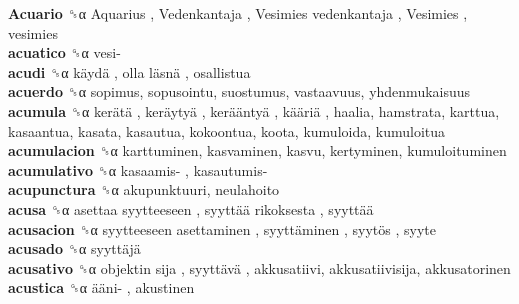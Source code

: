 \textbf{Acuario} ␝α   Aquarius ,  Vedenkantaja ,  Vesimies vedenkantaja ,  Vesimies , vesimies  \\
\textbf{acuatico} ␝α   vesi-   \\
\textbf{acudi} ␝α   käydä ,  olla läsnä , osallistua  \\
\textbf{acuerdo} ␝α  sopimus, sopusointu, suostumus, vastaavuus, yhdenmukaisuus  \\
\textbf{acumula} ␝α   kerätä ,  keräytyä ,  kerääntyä ,  kääriä , haalia, hamstrata, karttua, kasaantua, kasata, kasautua, kokoontua, koota, kumuloida, kumuloitua  \\
\textbf{acumulacion} ␝α  karttuminen, kasvaminen, kasvu, kertyminen, kumuloituminen  \\
\textbf{acumulativo} ␝α   kasaamis- ,  kasautumis-   \\
\textbf{acupunctura} ␝α  akupunktuuri, neulahoito  \\
\textbf{acusa} ␝α   asettaa syytteeseen ,  syyttää rikoksesta ,  syyttää   \\
\textbf{acusacion} ␝α   syytteeseen asettaminen ,  syyttäminen ,  syytös , syyte  \\
\textbf{acusado} ␝α   syyttäjä   \\
\textbf{acusativo} ␝α   objektin sija ,  syyttävä , akkusatiivi, akkusatiivisija, akkusatorinen  \\
\textbf{acustica} ␝α   ääni- , akustinen  \\
